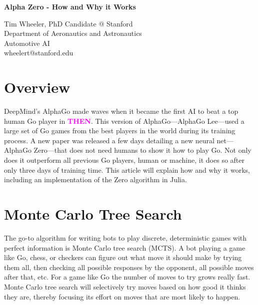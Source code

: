 \documentclass[10pt]{article}
\newcommand{\todo}[1]{\textbf{\textcolor{magenta}{#1}}}
\begin{document}
{\LARGE \bf Alpha Zero - How and Why it Works}

\vspace{2mm}

Tim Wheeler, PhD Candidate @ Stanford \\
Department of Aeronautics and Astronautics \\
Automotive AI \\
wheelert@stanford.edu \\[1em]

\section*{Overview}

DeepMind's AlphaGo made waves when it became the first AI to beat a top human Go player in \todo{THEN}.
This version of AlphaGo---AlphaGo Lee---used a large set of Go games from the best players in the world during its training process.
A new paper was released a few days detailing a new neural net---AlphaGo Zero---that does not need humans to show it how to play Go.
Not only does it outperform all previous Go players, human or machine, it does so after only three days of training time.
This article will explain how and why it works, including an implementation of the Zero algorithm in Julia.


\section*{Monte Carlo Tree Search}

The go-to algorithm for writing bots to play discrete, deterministic games with perfect information is Monte Carlo tree search (MCTS).
A bot playing a game like Go, chess, or checkers can figure out what move it should make by trying them all, then checking all possible responses by the opponent, all possible moves after that, etc.
For a game like Go the number of moves to try grows really fast.
Monte Carlo tree search will selectively try moves based on how good it thinks they are, thereby focusing its effort on moves that are most likely to happen.
\end{document}
